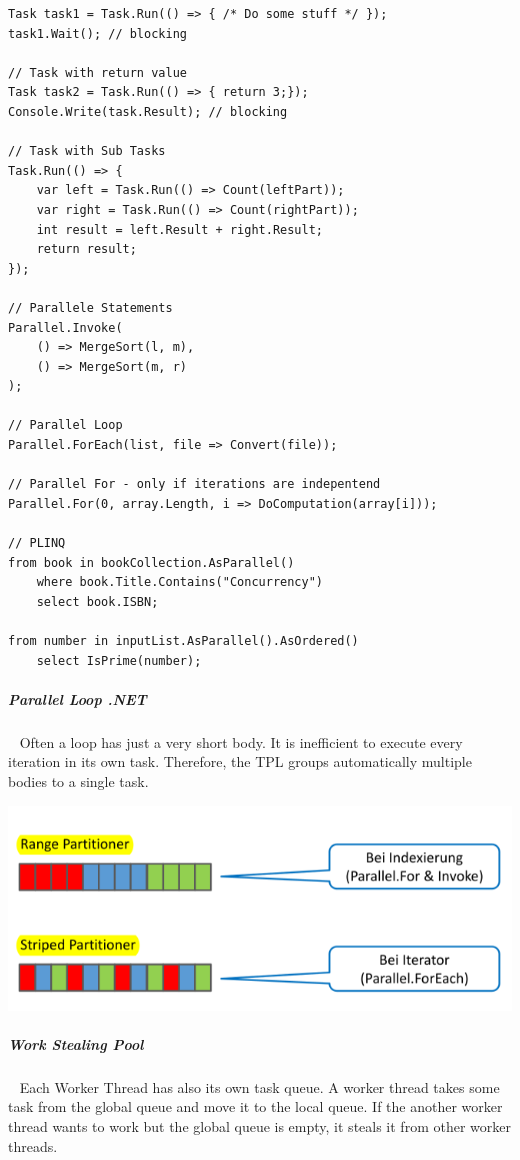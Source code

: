 \documentclass[11pt,twoside,landscape]{article}
\begin{document}
\begin{multicols}{3}
\lstset{language=csharp,label= ,caption= ,captionpos=b,numbers=none}
\begin{lstlisting}
Task task1 = Task.Run(() => { /* Do some stuff */ });
task1.Wait(); // blocking

// Task with return value
Task task2 = Task.Run(() => { return 3;});
Console.Write(task.Result); // blocking

// Task with Sub Tasks
Task.Run(() => {
    var left = Task.Run(() => Count(leftPart));
    var right = Task.Run(() => Count(rightPart));
    int result = left.Result + right.Result;
    return result;
});

// Parallele Statements
Parallel.Invoke(
    () => MergeSort(l, m),
    () => MergeSort(m, r)
);

// Parallel Loop
Parallel.ForEach(list, file => Convert(file));

// Parallel For - only if iterations are indepentend
Parallel.For(0, array.Length, i => DoComputation(array[i]));

// PLINQ
from book in bookCollection.AsParallel()
    where book.Title.Contains("Concurrency")
    select book.ISBN;

from number in inputList.AsParallel().AsOrdered()
    select IsPrime(number);
\end{lstlisting}
\subparagraph{Parallel Loop .NET} \
\label{sec:orgf6132e3}
Often a loop has just a very short body.
It is inefficient to execute every iteration in its own task.
Therefore, the TPL groups automatically multiple bodies to a single task.

{
\begin{center}
\includegraphics[width=.9\linewidth]{img/partitioning_in_loop_tpl.png}
\end{center}
\label{fig:partitioning-in-parallel-loops}
{
\subparagraph{Work Stealing Pool} \
\label{sec:org43adacd}
Each Worker Thread has also its own task queue.
A worker thread takes some task from the global queue and move it to the local queue.
If the another worker thread wants to work but the global queue is empty, it steals it from other worker threads.


}}
\end{multicols}
\end{document}
